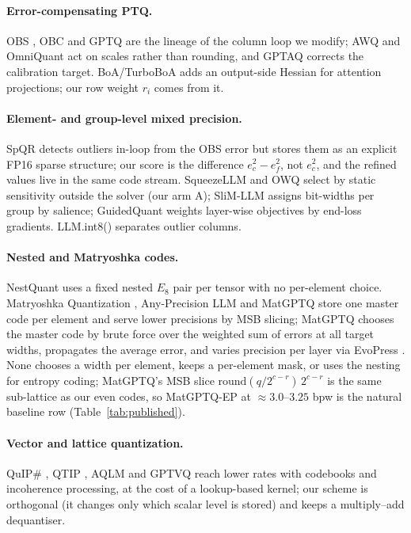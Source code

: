 \documentclass{article}
\begin{document}
\paragraph{Error-compensating PTQ.} OBS \citep{hassibi1993obs}, OBC
\citep{frantar2022obc} and GPTQ \citep{frantar2023gptq} are the lineage of
the column loop we modify; AWQ \citep{lin2024awq} and OmniQuant
\citep{shao2024omniquant} act on scales rather than rounding, and GPTAQ
\citep{li2025gptaq} corrects the calibration target. BoA/TurboBoA
\citep{kim2025boa} adds an output-side Hessian for attention projections;
our row weight $r_i$ comes from it.

\paragraph{Element- and group-level mixed precision.} SpQR
\citep{dettmers2024spqr} detects outliers in-loop from the OBS error but
stores them as an explicit FP16 sparse structure; our score is the
difference $e_c^2 - e_f^2$, not $e_c^2$, and the refined values live in
the same code stream. SqueezeLLM \citep{kim2024squeezellm} and OWQ
\citep{lee2024owq} select by static sensitivity outside the solver (our
arm A); SliM-LLM \citep{huang2024slimllm} assigns bit-widths per group by
salience; GuidedQuant \citep{kim2025guidedquant} weights layer-wise
objectives by end-loss gradients. LLM.int8() \citep{dettmers2022llmint8}
separates outlier columns.

\paragraph{Nested and Matryoshka codes.} NestQuant
\citep{savkin2025nestquant} uses a fixed nested $E_8$ pair per tensor
with no per-element choice. Matryoshka Quantization
\citep{nair2025matquant}, Any-Precision LLM \citep{park2024anyprecision}
and MatGPTQ \citep{kleinegger2026matgptq} store one master code per
element and serve lower precisions by MSB slicing; MatGPTQ chooses the
master code by brute force over the weighted sum of errors at all target
widths, propagates the average error, and varies precision per layer via
EvoPress \citep{sieberling2024evopress}. None chooses a width per
element, keeps a per-element mask, or uses the nesting for entropy coding;
MatGPTQ's MSB slice $\mathrm{round}(q/2^{c-r})\,2^{c-r}$ is the same
sub-lattice as our even codes, so MatGPTQ-EP at $\approx 3.0$--$3.25$ bpw
is the natural baseline row (Table~\ref{tab:published}).

\paragraph{Vector and lattice quantization.} QuIP\#
\citep{tseng2024quipsharp}, QTIP \citep{tseng2024qtip}, AQLM
\citep{egiazarian2024aqlm} and GPTVQ \citep{vanbaalen2024gptvq} reach
lower rates with codebooks and incoherence processing, at the cost of a
lookup-based kernel; our scheme is orthogonal (it changes only which
scalar level is stored) and keeps a multiply--add dequantiser.
\end{document}

